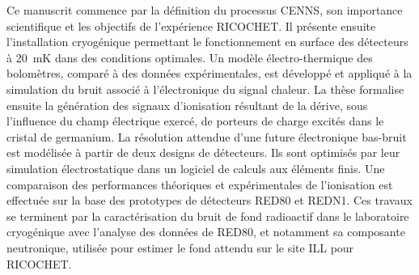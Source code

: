 \documentclass[
11pt, %
english, %
singlespacing, %
headsepline, %
]{MastersDoctoralThesis} %
\begin{document}
\begin{abstractfr}
{Ce manuscrit commence par la définition du processus CENNS, son importance scientifique et les objectifs de l'expérience RICOCHET. Il présente ensuite l'installation cryogénique permettant le fonctionnement en surface des détecteurs à \SI{20}{\milli\kelvin} dans des conditions optimales.
Un modèle électro-thermique des bolomètres, comparé à des données expérimentales, est développé et appliqué à la simulation du bruit associé à l’électronique du signal chaleur.
La thèse formalise ensuite la génération des signaux d'ionisation résultant de la dérive, sous l'influence du champ électrique exercé, de porteurs de charge excités dans le cristal de germanium. La résolution attendue d’une future électronique bas-bruit est modélisée à partir de deux designs de détecteurs. Ils sont optimisés par leur simulation électrostatique dans un logiciel de calculs aux éléments finis. Une comparaison des performances théoriques et expérimentales de l'ionisation est effectuée sur la base des prototypes de détecteurs RED80 et REDN1.
Ces travaux se terminent par la caractérisation du bruit de fond radioactif dans le laboratoire cryogénique avec l’analyse des données de RED80, et notamment sa composante neutronique, utilisée pour estimer le fond attendu sur le site ILL pour RICOCHET.

}
\end{abstractfr}


\end{document}
